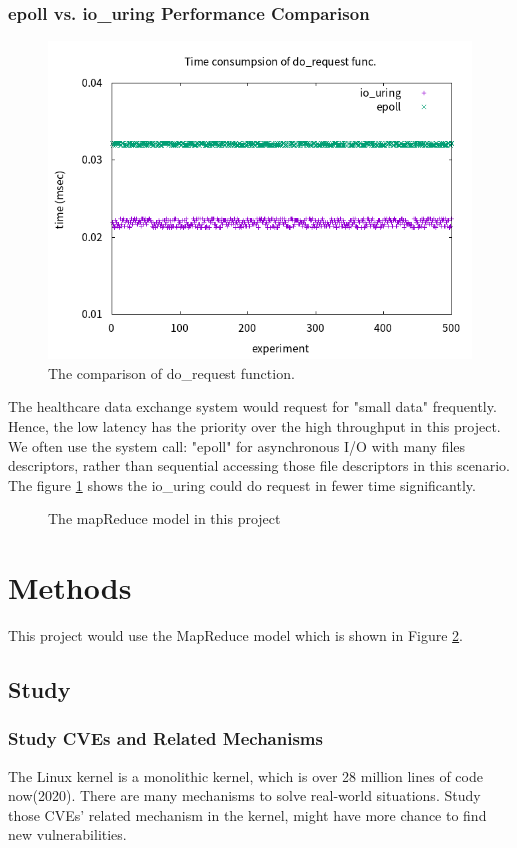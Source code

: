 \documentclass[12pt,a4paper]{article}
\begin{document}
\subsubsection{epoll vs. io\_uring Performance Comparison}
\begin{figure}
  \includegraphics[width=.45\textwidth]{io_uring.png}
  \caption{The comparison of do\_request function.}
  \label{Fig:iouring}
\end{figure}
The healthcare data exchange system would request for "small data" frequently.
Hence, the low latency has the priority over the high throughput in this project.
We often use the system call: "epoll" for asynchronous I/O with many files
descriptors, rather than sequential accessing those file descriptors in this scenario.
The figure \ref*{Fig:iouring} \cite{epoll_vs_iouring} shows the io\_uring could do request in fewer time
significantly.
\begin{figure}
  \caption[]{The mapReduce model in this project}
  \label{Fig:model}
\end{figure}

\section{Methods}

This project would use the MapReduce model which is shown in Figure \ref*{Fig:model}.

\subsection{Study}
\subsubsection{Study CVEs and Related Mechanisms}
The Linux kernel is a monolithic kernel, which is over 28 million lines of code now(2020). There
are many mechanisms to solve real-world situations. Study those CVEs' related mechanism in the
kernel, might have more chance to find new vulnerabilities.
\end{document}
